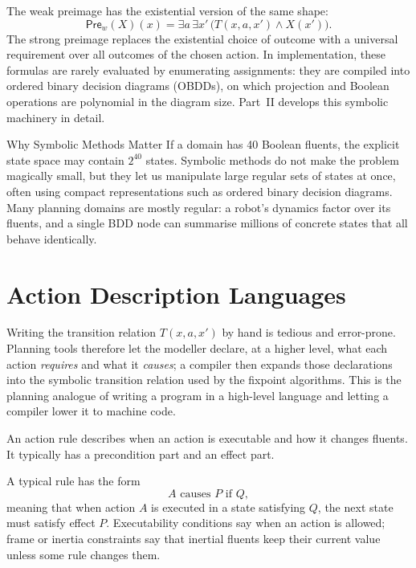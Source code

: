 The weak preimage has the existential version of the same shape:
\[
  \mathsf{Pre}_w(X)(x)
  =
  \exists a\,\exists x'\,
  \big(T(x,a,x')\wedge X(x')\big).
\]
The strong preimage replaces the existential choice of outcome with a
universal requirement over all outcomes of the chosen action.  In
implementation, these formulas are rarely evaluated by enumerating
assignments: they are compiled into ordered binary decision diagrams
(OBDDs), on which projection and Boolean operations are polynomial in
the diagram size.  Part~II develops this symbolic machinery in detail.

\begin{intermezzo}{Why Symbolic Methods Matter}
If a domain has 40 Boolean fluents, the explicit state space may contain
$2^{40}$ states.  Symbolic methods do not make the problem magically
small, but they let us manipulate large regular sets of states at once,
often using compact representations such as ordered binary decision
diagrams.  Many planning domains are mostly regular: a robot's dynamics
factor over its fluents, and a single BDD node can summarise millions
of concrete states that all behave identically.
\end{intermezzo}


\section{Action Description Languages}
\label{sec:action-description-languages}

Writing the transition relation $T(x,a,x')$ by hand is tedious and
error-prone.  Planning tools therefore let the modeller declare, at a
higher level, what each action \emph{requires} and what it
\emph{causes}; a compiler then expands those declarations into the
symbolic transition relation used by the fixpoint algorithms.  This is
the planning analogue of writing a program in a high-level language and
letting a compiler lower it to machine code.

\begin{definition}
\label{def:action-rule}
An action rule describes when an action is executable and how it changes
fluents.  It typically has a precondition part and an effect part.
\end{definition}

A typical rule has the form
\[
  A \text{ causes } P \text{ if } Q,
\]
meaning that when action $A$ is executed in a state satisfying $Q$, the
next state must satisfy effect $P$.  Executability conditions say when
an action is allowed; frame or inertia constraints say that inertial
fluents keep their current value unless some rule changes them.


